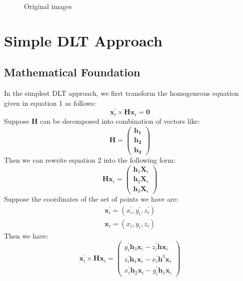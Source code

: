 \documentclass[conference]{IEEEtran}
\newcommand{\mat}[1]{\mathbf{#1}} %
\begin{document}
\begin{figure*}[!hbpt]
  \caption{Original images}
  \label{org_img} %
\end{figure*}

\section{Simple DLT Approach}
\subsection{Mathematical Foundation}
In the simplest DLT approach, we first transform the homogeneous equation given in equation 1 as follows:
\begin{equation}
	\mat{x}_i^\prime \times \mat{H}\mat{x}_i = \mat{0}
\end{equation}
Suppose $\mat{H}$ can be decomposed into combination of vectors like:
\begin{equation}
	\mat{H} = \begin{pmatrix}
				\mat{h_1}\\
				\mat{h_2}\\
				\mat{h_3}
		       \end{pmatrix}
\end{equation}
Then we can rewrite equation 2 into the following form:
\begin{equation}
	\mat{H}\mat{x}_i =
	\begin{pmatrix}
		\mat{h}_1\mat{X}_i\\
		\mat{h}_2\mat{X}_i\\
		\mat{h}_3\mat{X}_i
	\end{pmatrix}
\end{equation}
Suppose the coordinates of the set of points we have are:
\begin{equation}
	\begin{split}
		\mat{x}_i^\prime = (x_i^\prime, y_i^\prime, z_i^\prime)\\
		\mat{x}_i = (x_i, y_i, z_i)
	\end{split}
\end{equation}
Then we have:
\begin{equation}
  \mat{x}_i^\prime\times \mat{H}\mat{x}_i =
  \begin{pmatrix}
    y_i^\prime\mat{h}_3\mat{x}_i - z_i^\prime\mat{h}\mat{x}_i\\
	z_i^\prime\mat{h}_1\mat{x}_i - x_i^\prime\mat{h}^3\mat{x}_i\\
	x_i^\prime\mat{h}_2\mat{x}_i - y_i^\prime\mat{h}_1\mat{x}_i
  \end{pmatrix}
\end{equation}
\end{document}
